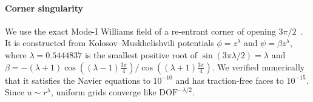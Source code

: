 \documentclass[preprint,12pt]{elsarticle}
\theoremstyle{remark}
\begin{document}
\begin{table}[t]\centering\footnotesize
\begin{minipage}{0.5\textwidth}\centering
\caption{Smooth solution, Dirichlet edges.}\label{tab:elsmooth}
\end{minipage}\hfill
\begin{minipage}{0.47\textwidth}\centering
\caption{Dependence on $\nu$ (Dirichlet edges).}\label{tab:nu}
\end{minipage}
\end{table}

\paragraph{Corner singularity} We use the exact Mode-I Williams field of a re-entrant corner of opening
$3\pi/2$~\cite{williams1952stress,grisvard1985elliptic}. It is constructed from Kolosov--Muskhelishvili
potentials $\phi=z^\lambda$ and $\psi=\beta z^\lambda$, where $\lambda=0.5444837$ is the smallest
positive root of $\sin(3\pi\lambda/2)=\lambda$ and
$\beta=-(\lambda+1)\cos((\lambda-1)\tfrac{3\pi}4)/\cos((\lambda+1)\tfrac{3\pi}4)$. We verified numerically
that it satisfies the Navier equations to $10^{-10}$ and has traction-free faces to $10^{-15}$. Since
$u\sim r^\lambda$, uniform grids converge like $\mathrm{DOF}^{-\lambda/2}$.
\end{document}
